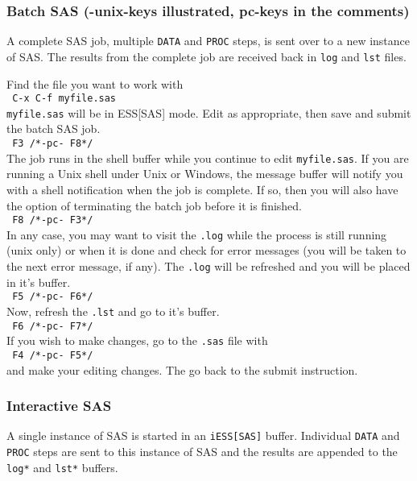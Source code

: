 \documentclass{article}
\newcommand{\elcode}[1]{\\{\tt\hspace*{2em} #1}\\}
\begin{document}
\subsubsection{Batch SAS (-unix-keys illustrated, pc-keys in the comments)}
\label{sec:SAS:batch}
A complete SAS job, multiple {\tt DATA} and {\tt PROC} steps, is sent over
to a new instance of SAS.  The results from the complete job are received back
in {\tt log} and {\tt lst} files.

Find the file you want to work with
    \elcode{C-x C-f myfile.sas}
{\tt myfile.sas} will be in ESS[SAS] mode.
Edit as appropriate, then save and submit the batch SAS job.
    \elcode{F3  /*-pc- F8*/}
The job runs in the shell buffer while you continue to edit 
{\tt myfile.sas}.  If you are running a Unix shell under Unix or
Windows, the message buffer will notify you with a shell
notification when the job is complete.  If so, then you 
will also have the option of terminating the batch job
before it is finished.
    \elcode{F8  /*-pc- F3*/}
In any case, you may want to visit the {\tt .log} while the process
is still running (unix only) or when it is done and check for
error messages 
(you will be taken to the next error message, if any).
The {\tt .log} will be refreshed and you will be placed in it's buffer.
    \elcode{F5  /*-pc- F6*/}
Now, refresh the {\tt .lst} and go to it's buffer.
    \elcode{F6  /*-pc- F7*/}
If you wish to make changes, go to the {\tt .sas} file with
    \elcode{F4 /*-pc- F5*/}
and make your editing changes.  The go back to the submit instruction.

\subsubsection{Interactive SAS}
A single instance of SAS is started in an {\tt iESS[SAS]} buffer.  Individual
{\tt DATA} and {\tt PROC} steps are sent to this instance of SAS and the results
are appended to the {\tt *log*} and {\tt *lst*} buffers.
\end{document}
